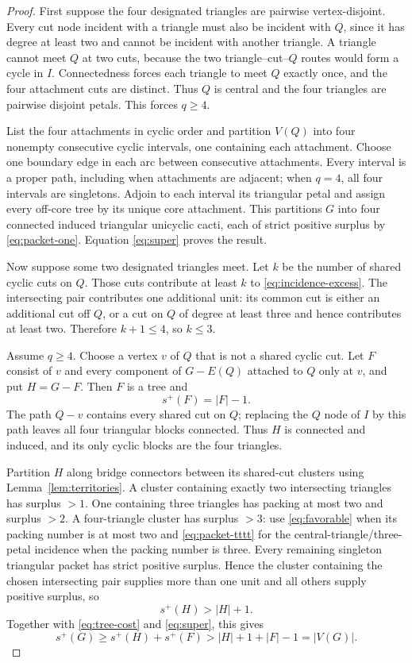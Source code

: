 \documentclass[11pt]{article}
\newcommand{\spE}{s^+}
\begin{document}
\begin{proof}
First suppose the four designated triangles are pairwise vertex-disjoint.
Every cut node incident with a triangle must also be incident with $Q$, since
it has degree at least two and cannot be incident with another triangle.  A
triangle cannot meet $Q$ at two cuts, because the two triangle--cut--$Q$ routes
would form a cycle in $I$.  Connectedness forces each triangle to meet $Q$
exactly once, and the four attachment cuts are distinct.  Thus $Q$ is central
and the four triangles are pairwise disjoint petals.  This forces $q\geq4$.

List the four attachments in cyclic order and partition $V(Q)$ into four
nonempty consecutive cyclic intervals, one containing each attachment.  Choose
one boundary edge in each arc between consecutive attachments.  Every interval
is a proper path, including when attachments are adjacent; when $q=4$, all
four intervals are singletons.  Adjoin to each interval its triangular petal
and assign every off-core tree by its unique core attachment.  This partitions
$G$ into four connected induced triangular unicyclic cacti, each of strict
positive surplus by \eqref{eq:packet-one}.  Equation \eqref{eq:super} proves
the result.

Now suppose some two designated triangles meet.  Let $k$ be the number of
shared cyclic cuts on $Q$.  Those cuts contribute at least $k$ to
\eqref{eq:incidence-excess}.  The intersecting pair contributes one additional
unit: its common cut is either an additional cut off $Q$, or a cut on $Q$ of
degree at least three and hence contributes at least two.  Therefore
$k+1\leq4$, so $k\leq3$.

Assume $q\geq4$.  Choose a vertex $v$ of $Q$ that is not a shared cyclic cut.
Let $F$ consist of $v$ and every component of $G-E(Q)$ attached to $Q$ only
at $v$, and put $H=G-F$.  Then $F$ is a tree and
\begin{equation}\label{eq:tree-cost}
 \spE(F)=|F|-1.
\end{equation}
The path $Q-v$ contains every shared cut on $Q$; replacing the $Q$ node of $I$
by this path leaves all four triangular blocks connected.  Thus $H$ is
connected and induced, and its only cyclic blocks are the four triangles.

Partition $H$ along bridge connectors between its shared-cut clusters using
Lemma~\ref{lem:territories}.  A cluster containing exactly two intersecting
triangles has surplus $>1$.  One containing three triangles has packing at
most two and surplus $>2$.  A four-triangle cluster has surplus $>3$: use
\eqref{eq:favorable} when its packing number is at most two and
\eqref{eq:packet-tttt} for the central-triangle/three-petal incidence when the
packing number is three.  Every remaining singleton triangular packet has
strict positive surplus.  Hence the cluster containing the chosen intersecting
pair supplies more than one unit and all others supply positive surplus, so
\[
 \spE(H)>|H|+1.
\]
Together with \eqref{eq:tree-cost} and \eqref{eq:super}, this gives
\[
 \spE(G)\geq\spE(H)+\spE(F)
 >|H|+1+|F|-1=|V(G)|.
\]


\end{proof}
\end{document}

